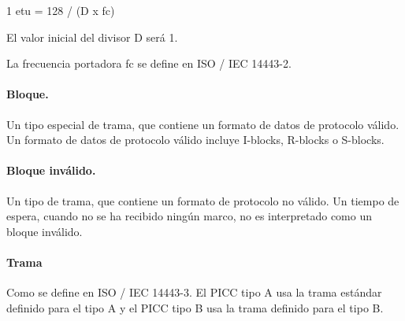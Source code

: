 1 etu = 128 / (D x fc)\par

El valor inicial del divisor D será 1.\par

La frecuencia portadora fc se define en ISO / IEC 14443-2.\par

\paragraph{Bloque.}
Un tipo especial de trama, que contiene un formato de datos de protocolo válido. Un formato de datos de protocolo válido incluye I-blocks, R-blocks o S-blocks.\par

\paragraph{Bloque inválido.}
Un tipo de trama, que contiene un formato de protocolo no válido. Un tiempo de espera, cuando no se ha recibido ningún marco, no es interpretado como un bloque inválido.\par

\paragraph{Trama}
Como se define en ISO / IEC 14443-3. El PICC tipo A usa la trama estándar definido para el tipo A y el PICC tipo B usa la trama definido para el tipo B.\par


\vspace{\baselineskip}
